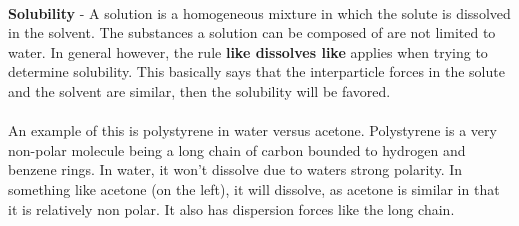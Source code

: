 \documentclass{article}
\begin{document}
\\
\textbf{Solubility} - A solution is a homogeneous mixture in which the solute is dissolved in the solvent. The substances a solution can be composed of are not limited to water. In general however, the rule \textbf{like dissolves like} applies when trying to determine solubility. This basically says that the interparticle forces in the solute and the solvent are similar, then the solubility will be favored.\\
\\
An example of this is polystyrene in water versus acetone. Polystyrene is a very non-polar molecule being a long chain of carbon bounded to hydrogen and benzene rings. In water, it won't dissolve due to waters strong polarity. In something like acetone (on the left), it will dissolve, as acetone is similar in that it is relatively non polar. It also has dispersion forces like the long chain.

\begin{qq}

	\begin{center}

		\hspace{-10pt}\begin{minipage}{10cm}

		\end{minipage}
		\hspace{20pt}\begin{minipage}{3cm}


		\end{minipage}
	\end{center}

\end{qq}
\end{document}
